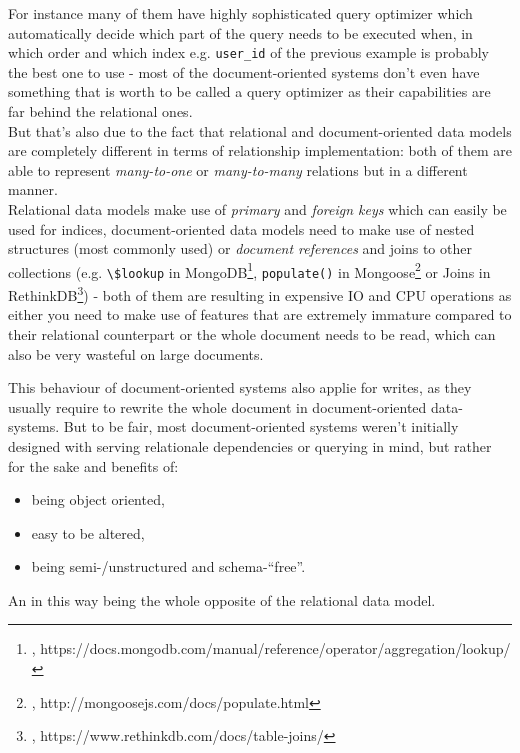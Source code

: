 {For instance many of them have highly sophisticated query optimizer which automatically decide which part of the query needs to be executed when, in which order and which index {e.g. \lstinline{user_id} of the previous example} is probably the best one to use - most of the document-oriented systems don't even have something that is worth to be called a query optimizer as their capabilities are far behind the relational ones. \\
But that's also due to the fact that relational and document-oriented data models are completely different in terms of relationship implementation: both of them are able to represent \textit{many-to-one} or \textit{many-to-many} relations but in a different manner. \\
Relational data models make use of \textit{primary} and \textit{foreign keys} which can easily be used for indices, document-oriented data models need to make use of nested structures (most commonly used) or \textit{document references} and joins to other collections (e.g. \lstinline{\$lookup} in MongoDB\footnote{\cite{MDBLKP}, https://docs.mongodb.com/manual/reference/operator/aggregation/lookup/}, \lstinline{populate()} in Mongoose\footnote{\cite{MGPPL}, http://mongoosejs.com/docs/populate.html} or Joins in RethinkDB\footnote{\cite{RDBJN}, https://www.rethinkdb.com/docs/table-joins/}) - both of them are resulting in expensive IO and CPU operations as either you need to make use of features that are extremely immature compared to their relational counterpart or the whole document needs to be read, which can also be very wasteful on large documents. \

This behaviour of document-oriented systems also applie for writes, as they usually require to rewrite the whole document in document-oriented data-systems. 
But to be fair, most document-oriented systems weren't initially designed with serving relationale dependencies or querying in mind, but rather for the sake and benefits of: 
\begin{samepage}
\begin{itemize}
		\item being object oriented, 
		\item easy to be altered, 
		\item  being semi-/unstructured and schema-``free''.\\
\end{itemize}
\end{samepage}
An in this way being the whole opposite of the relational data model.


}
